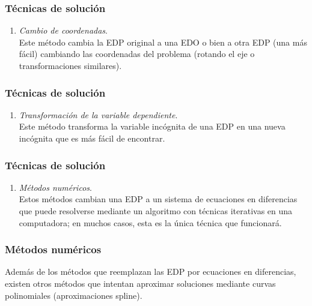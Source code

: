 \documentclass[12pt]{beamer}
\begin{document}
\begin{frame}
\frametitle{Técnicas de solución}
\begin{enumerate}
\conti
\item \emph{Cambio de coordenadas}.
\\
\bigskip
Este método cambia la EDP original a una EDO o bien a otra EDP (una más fácil) cambiando las coordenadas del problema (rotando el eje o transformaciones similares).
\seti
\end{enumerate}
\end{frame}
\begin{frame}
\frametitle{Técnicas de solución}
\begin{enumerate}
\conti
\item \emph{Transformación de la variable dependiente}.
\\
\bigskip
Este método transforma la variable incógnita de una EDP en una nueva incógnita que es más fácil de encontrar.
\seti
\end{enumerate}
\end{frame}
\begin{frame}
\frametitle{Técnicas de solución}
\begin{enumerate}
\conti
\item \emph{Métodos numéricos}. 
\\
\bigskip
Estos métodos cambian una EDP a un sistema de ecuaciones en diferencias que puede resolverse mediante un algoritmo con técnicas iterativas en una computadora; en muchos casos, esta es la única técnica que funcionará. 
\seti
\end{enumerate}
\end{frame}
\begin{frame}
\frametitle{Métodos numéricos}
Además de los métodos que reemplazan las EDP por ecuaciones en diferencias, existen otros métodos que intentan aproximar soluciones mediante curvas polinomiales (aproximaciones spline).
\end{frame}
\end{document}
